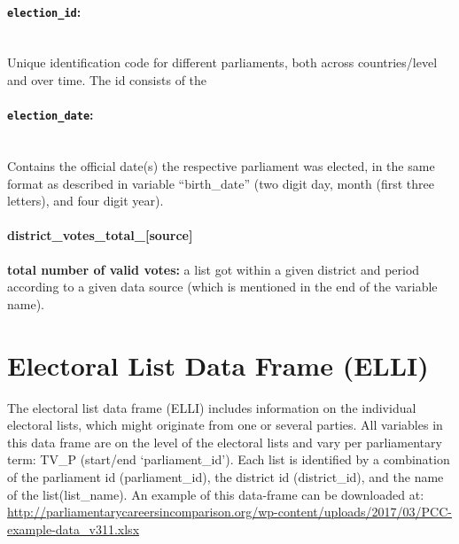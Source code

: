 \documentclass{article}
\begin{document}
\paragraph{\texttt{election\_id}:}\\
    Unique identification code for different parliaments, both across countries/level and over time. The id consists of the 



\paragraph{\texttt{election\_date}:}\\
    Contains the official date(s) the respective parliament was elected, in the same format as described in variable ``birth\_date” (two digit day, month (first three letters), and four digit year).
    
    \paragraph{district\_votes\_total\_[source]} 
   \textbf{total number of valid votes:}  a list got within a given district and period according to a given data source (which is mentioned in the end of the variable name). 





\section{Electoral List Data Frame  (\gls{ELLI})}\label{ELLI}
The electoral list data frame (\gls{ELLI}) includes information on the individual electoral lists, which might originate from one or several parties. All variables in this data frame are on the level of the electoral lists and vary per parliamentary term: TV\_P (start/end `parliament\_id'). Each list is identified by a combination of the parliament id (parliament\_id), the district id (district\_id), and the name of the list(list\_name). An example of this data-frame can be downloaded at: \url{http://parliamentarycareersincomparison.org/wp-content/uploads/2017/03/PCC-example-data_v311.xlsx}
\end{document}
